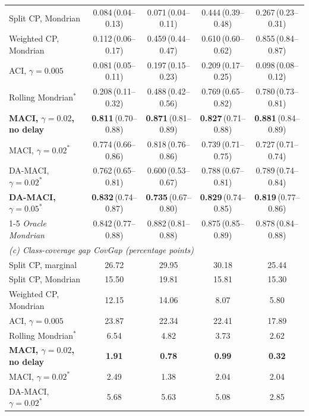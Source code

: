 \begin{table}[!htbp]
\begin{tabular}{lcccc}
Split CP, Mondrian & 0.084\,{\tiny(0.04--0.13)} & 0.071\,{\tiny(0.04--0.11)} & 0.444\,{\tiny(0.39--0.48)} & 0.267\,{\tiny(0.23--0.31)}\\
Weighted CP, Mondrian & 0.112\,{\tiny(0.06--0.17)} & 0.459\,{\tiny(0.44--0.47)} & 0.610\,{\tiny(0.60--0.62)} & 0.855\,{\tiny(0.84--0.87)}\\
ACI, $\gamma=0.005$ & 0.081\,{\tiny(0.05--0.11)} & 0.197\,{\tiny(0.15--0.23)} & 0.209\,{\tiny(0.17--0.25)} & 0.098\,{\tiny(0.08--0.12)}\\
Rolling Mondrian$^{\ast}$ & 0.208\,{\tiny(0.11--0.32)} & 0.488\,{\tiny(0.42--0.56)} & 0.769\,{\tiny(0.65--0.82)} & 0.780\,{\tiny(0.73--0.81)}\\
\textbf{MACI, $\gamma=0.02$, no delay} & \textbf{0.811}\,{\tiny(0.70--0.88)} & \textbf{0.871}\,{\tiny(0.81--0.89)} & \textbf{0.827}\,{\tiny(0.71--0.88)} & \textbf{0.881}\,{\tiny(0.84--0.89)}\\
MACI, $\gamma=0.02^{\ast}$ & 0.774\,{\tiny(0.66--0.86)} & 0.818\,{\tiny(0.76--0.86)} & 0.739\,{\tiny(0.71--0.75)} & 0.727\,{\tiny(0.71--0.74)}\\
DA-MACI, $\gamma=0.02^{\ast}$ & 0.762\,{\tiny(0.65--0.81)} & 0.600\,{\tiny(0.53--0.67)} & 0.788\,{\tiny(0.67--0.81)} & 0.789\,{\tiny(0.74--0.84)}\\
\textbf{DA-MACI, $\gamma=0.05^{\ast}$} & \textbf{0.832}\,{\tiny(0.74--0.87)} & \textbf{0.735}\,{\tiny(0.67--0.80)} & \textbf{0.829}\,{\tiny(0.74--0.85)} & \textbf{0.819}\,{\tiny(0.77--0.86)}\\
\cmidrule(l){1-5}
\emph{Oracle Mondrian} & 0.842\,{\tiny(0.77--0.88)} & 0.882\,{\tiny(0.81--0.88)} & 0.875\,{\tiny(0.85--0.89)} & 0.878\,{\tiny(0.84--0.88)}\\
\midrule
\multicolumn{5}{l}{\emph{(c) Class-coverage gap CovGap (percentage points)}}\\
Split CP, marginal & 26.72 & 29.95 & 30.18 & 25.44\\
Split CP, Mondrian & 15.50 & 19.81 & 15.81 & 15.30\\
Weighted CP, Mondrian & 12.15 & 14.06 & 8.07 & 5.80\\
ACI, $\gamma=0.005$ & 23.87 & 22.34 & 22.41 & 17.89\\
Rolling Mondrian$^{\ast}$ & 6.54 & 4.82 & 3.73 & 2.62\\
\textbf{MACI, $\gamma=0.02$, no delay} & \textbf{1.91} & \textbf{0.78} & \textbf{0.99} & \textbf{0.32}\\
MACI, $\gamma=0.02^{\ast}$ & 2.49 & 1.38 & 2.04 & 2.04\\
DA-MACI, $\gamma=0.02^{\ast}$ & 5.68 & 5.63 & 5.08 & 2.85\\

\end{tabular}
\end{table}

